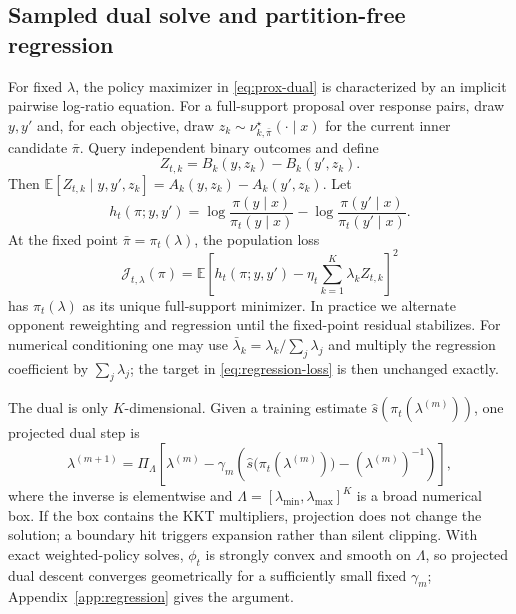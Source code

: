 \documentclass{article}
\theoremstyle{remark}
\theoremstyle{plain}
\newcommand{\E}{\mathbb{E}}
\begin{document}
\subsection{Sampled dual solve and partition-free regression}
For fixed $\lambda$, the policy maximizer in \eqref{eq:prox-dual} is characterized by an implicit pairwise log-ratio equation. For a full-support proposal over response pairs, draw $y,y'$ and, for each objective, draw
$z_k\sim\nu^\star_{k,\bar\pi}(\cdot\mid x)$ for the current inner candidate $\bar\pi$. Query independent binary outcomes and define
\begin{equation}
Z_{t,k}=B_k(y,z_k)-B_k(y',z_k).
\label{eq:binary-target}
\end{equation}
Then
$\E[Z_{t,k}\mid y,y',z_k]=A_k(y,z_k)-A_k(y',z_k)$.
Let
\begin{equation}
h_t(\pi;y,y')
=
\log\frac{\pi(y\mid x)}{\pi_t(y\mid x)}
-
\log\frac{\pi(y'\mid x)}{\pi_t(y'\mid x)}.
\label{eq:log-ratio-change}
\end{equation}
At the fixed point $\bar\pi=\pi_t(\lambda)$, the population loss
\begin{equation}
\mathcal J_{t,\lambda}(\pi)
=
\E\left[
 h_t(\pi;y,y')
 -\eta_t\sum_{k=1}^K\lambda_k Z_{t,k}
\right]^2
\label{eq:regression-loss}
\end{equation}
has $\pi_t(\lambda)$ as its unique full-support minimizer. In practice we alternate opponent reweighting and regression until the fixed-point residual stabilizes. For numerical conditioning one may use $\bar\lambda_k=\lambda_k/\sum_j\lambda_j$ and multiply the regression coefficient by $\sum_j\lambda_j$; the target in \eqref{eq:regression-loss} is then unchanged exactly.

The dual is only $K$-dimensional. Given a training estimate $\widehat s(\pi_t(\lambda^{(m)}))$, one projected dual step is
\begin{equation}
\lambda^{(m+1)}
=
\Pi_{\Lambda}\!\left[
\lambda^{(m)}
-
\gamma_m\left(
\widehat s\big(\pi_t(\lambda^{(m)})\big)
-(\lambda^{(m)})^{-1}
\right)
\right],
\label{eq:dual-update}
\end{equation}
where the inverse is elementwise and $\Lambda=[\lambda_{\min},\lambda_{\max}]^K$ is a broad numerical box. If the box contains the KKT multipliers, projection does not change the solution; a boundary hit triggers expansion rather than silent clipping. With exact weighted-policy solves, $\phi_t$ is strongly convex and smooth on $\Lambda$, so projected dual descent converges geometrically for a sufficiently small fixed $\gamma_m$; Appendix~\ref{app:regression} gives the argument.
\end{document}
